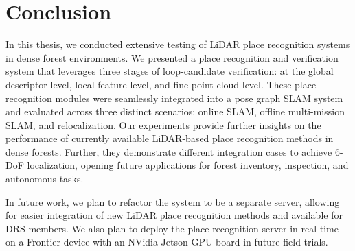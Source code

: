 \chapter{Conclusion}
\label{chap:conclusion}

In this thesis, we conducted extensive testing of LiDAR place recognition systems in dense forest environments. We presented a place recognition and verification system that leverages three stages of loop-candidate verification: at the global descriptor-level, local feature-level, and fine point cloud level. These place recognition modules were seamlessly integrated into a pose graph SLAM system and evaluated across three distinct scenarios: online SLAM, offline multi-mission SLAM, and relocalization. Our experiments provide further insights on the performance of currently available LiDAR-based place recognition methods in dense forests. Further, they demonstrate different integration cases to achieve 6-DoF localization, opening future applications for forest inventory, inspection, and autonomous tasks. 

In future work, we plan to refactor the system to be a separate server, allowing for easier integration of new LiDAR place recognition methods and available for DRS members. We also plan to deploy the place recognition server in real-time on a Frontier device with an NVidia Jetson GPU board in future field trials. 
